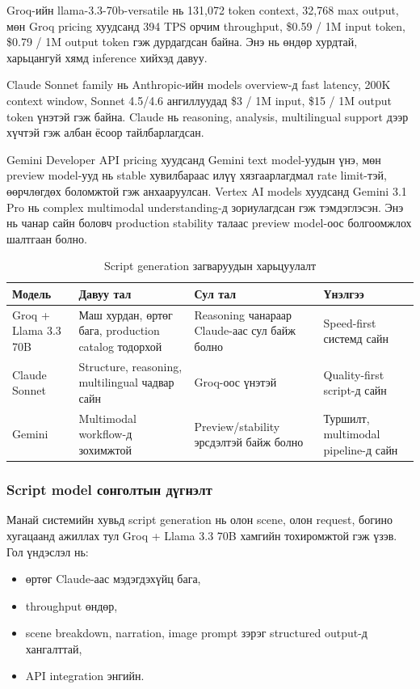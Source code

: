Groq-ийн llama-3.3-70b-versatile нь 131,072 token context, 32,768 max output, мөн Groq pricing хуудсанд 394 TPS орчим throughput, \$0.59 / 1M input token, \$0.79 / 1M output token гэж дурдагдсан байна. Энэ нь өндөр хурдтай, харьцангуй хямд inference хийхэд давуу.

Claude Sonnet family нь Anthropic-ийн models overview-д fast latency, 200K context window, Sonnet 4.5/4.6 ангиллуудад \$3 / 1M input, \$15 / 1M output token үнэтэй гэж байна. Claude нь reasoning, analysis, multilingual support дээр хүчтэй гэж албан ёсоор тайлбарлагдсан.

Gemini Developer API pricing хуудсанд Gemini text model-уудын үнэ, мөн preview model-ууд нь stable хувилбараас илүү хязгаарлагдмал rate limit-тэй, өөрчлөгдөх боломжтой гэж анхааруулсан. Vertex AI models хуудсанд Gemini 3.1 Pro нь complex multimodal understanding-д зориулагдсан гэж тэмдэглэсэн. Энэ нь чанар сайн боловч production stability талаас preview model-оос болгоомжлох шалтгаан болно.

\begin{table}[H]
\centering
\small
\begin{tabular}{|p{2.3cm}|p{3.6cm}|p{3.6cm}|p{2.8cm}|}
\hline
\textbf{Модель} & \textbf{Давуу тал} & \textbf{Сул тал} & \textbf{Үнэлгээ} \\
\hline
Groq + Llama 3.3 70B & Маш хурдан, өртөг бага, production catalog тодорхой & Reasoning чанараар Claude-аас сул байж болно & Speed-first системд сайн \\
\hline
Claude Sonnet & Structure, reasoning, multilingual чадвар сайн & Groq-оос үнэтэй & Quality-first script-д сайн \\
\hline
Gemini & Multimodal workflow-д зохимжтой & Preview/stability эрсдэлтэй байж болно & Туршилт, multimodal pipeline-д сайн \\
\hline
\end{tabular}
\caption{Script generation загваруудын харьцуулалт}
\end{table}

\subsubsection{Script model сонголтын дүгнэлт}

Манай системийн хувьд script generation нь олон scene, олон request, богино хугацаанд ажиллах тул Groq + Llama 3.3 70B хамгийн тохиромжтой гэж үзэв. Гол үндэслэл нь:

\begin{itemize}
\item өртөг Claude-аас мэдэгдэхүйц бага,
\item throughput өндөр,
\item scene breakdown, narration, image prompt зэрэг structured output-д хангалттай,
\item API integration энгийн.
\end{itemize}

